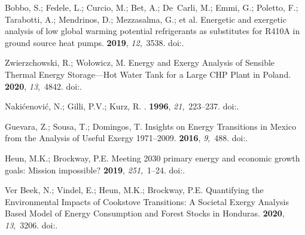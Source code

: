 \documentclass[energies,article,accept,moreauthors,pdftex]{Definitions/mdpi}\usepackage[]{graphicx}\usepackage[]{color}
\begin{document}
\begin{thebibliography}{999}
Bobbo, S.; Fedele, L.; Curcio, M.; Bet, A.; De~Carli, M.; Emmi, G.; Poletto,
  F.; Tarabotti, A.; Mendrinos, D.; Mezzasalma, G.; et al.
\newblock Energetic and exergetic analysis of low global warming potential
  refrigerants as substitutes for {R410A} in ground source heat pumps.
 {\bf 2019}, {\em 12},~3538.
\newblock
  doi:{\href{https://doi.org/10.3390/en12183538}{}}.%

Zwierzchowski, R.; Wo{\l}owicz, M.
\newblock Energy and Exergy Analysis of Sensible Thermal Energy Storage---Hot
  Water Tank for a Large {CHP} Plant in {P}oland.
 {\bf 2020}, {\em 13},~4842.
\newblock
  doi:{\href{https://doi.org/10.3390/en13184842}{}}.%

Naki{\'{c}}enovi{\'{c}}, N.; Gilli, P.V.; Kurz, R.
.
 {\bf 1996}, {\em 21},~223--237.
\newblock
  doi:{\href{https://doi.org/10.1016/0360-5442(96)00001-1}{}}.%

Guevara, Z.; Sousa, T.; Domingos, T.
\newblock Insights on Energy Transitions in {M}exico from the Analysis of
  Useful Exergy 1971--2009.
 {\bf 2016}, {\em 9},~488.
\newblock
  doi:{\href{https://doi.org/10.3390/en9070488}{}}.%

Heun, M.K.; Brockway, P.E.
\newblock Meeting 2030 primary energy and economic growth goals: Mission
  impossible?
 {\bf 2019}, {\em 251},~1--24.
\newblock
  doi:{\href{https://doi.org/10.1016/j.apenergy.2019.01.255}{}}.%

{Ver Beek}, N.; Vindel, E.; Heun, M.K.; Brockway, P.E.
\newblock Quantifying the Environmental Impacts of Cookstove Transitions: A
  Societal Exergy Analysis Based Model of Energy Consumption and Forest Stocks
  in {H}onduras.
 {\bf 2020}, {\em 13},~3206.
\newblock
  doi:{\href{https://doi.org/10.3390/en13123206}{}}.%


\end{thebibliography}
\end{document}
